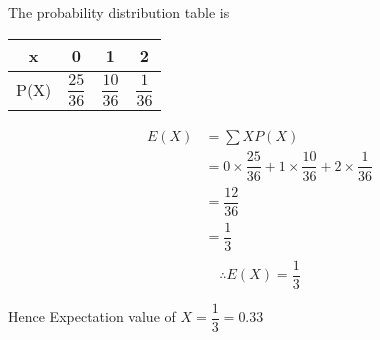 \documentclass[journal,12pt,twocolumn]{IEEEtran}
\begin{document}
\null \par
The probability distribution table is 
\begin{table}[hbt!]
\begin{tabular}{|l|c|c|c|}
\hline
\multicolumn{1}{|c|}{x} & 0 & 1 & 2 \\ \hline
P(X)                    &$\dfrac{25}{36}$   &$\dfrac{10}{36}$   &$\dfrac{1}{36}$ \\ \hline
\end{tabular}
\end{table}
\begin{align*}
    E(X) & =\sum XP(X)\\
    & = 0\times\dfrac{25}{36} + 1\times\dfrac{10}{36} + 2\times\dfrac{1}{36} \\
    & = \dfrac{12}{36} \\
    &= \dfrac{1}{3} \\
\end{align*}
$$\therefore E(X) = \dfrac{1}{3}$$

Hence Expectation value of $X=\dfrac{1}{3}=0.33$ 
\end{document}
